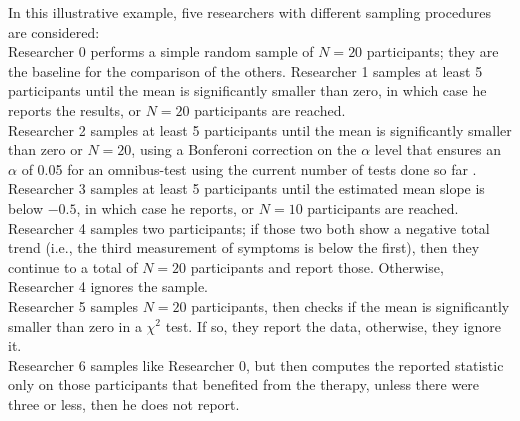 \documentclass[man]{apa7}
\theoremstyle{definition}
\begin{document}
In this illustrative example, five researchers with different sampling procedures are considered: \\[0.1cm]  %
Researcher 0 performs a simple random sample of $N=20$ participants; they are the baseline for the comparison of the others. 
Researcher 1 samples at least 5 participants until the mean is significantly smaller than zero, in which case he reports the results, or $N=20$ participants are reached. \\
Researcher 2 samples at least 5 participants until the mean is significantly smaller than zero or $N=20$, using a Bonferoni correction on the $\alpha$ level that ensures an $\alpha$ of 0.05 for an omnibus-test using the current number of tests done so far . \\
Researcher 3 samples at least 5 participants until the estimated mean slope is below $-0.5$, in which case he reports, or $N=10$ %
participants are reached.
Researcher 4 samples two participants; if those two both show a negative total trend (i.e., the third measurement of symptoms is below the first), then they continue to a total of $N=20$ participants and report those. Otherwise, Researcher 4 ignores the sample. \\
Researcher 5 samples $N=20$ participants, then checks if the mean is significantly smaller than zero in a $\chi^2$ test. If so, they report the data, otherwise, they ignore it. \\
Researcher 6 samples like Researcher 0, but then computes the reported statistic only on those participants that benefited from the therapy, unless there were three or less, then he does not report. 

\end{document}

